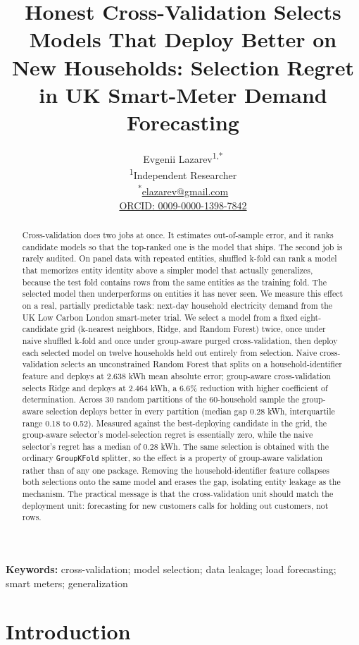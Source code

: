 \documentclass[10pt]{article}
\title{Honest Cross-Validation Selects Models That Deploy Better on New
Households: Selection Regret in UK Smart-Meter Demand Forecasting}
\author{
Evgenii Lazarev\textsuperscript{1,*}\\
\textsuperscript{1}Independent Researcher\\
\textsuperscript{*}\href{mailto:elazarev@gmail.com}{elazarev@gmail.com}\\
\href{https://orcid.org/0009-0000-1398-7842}{ORCID: 0009-0000-1398-7842}
}
\date{}
\begin{document}
\maketitle

\begin{abstract}
Cross-validation does two jobs at once. It estimates out-of-sample error, and it
ranks candidate models so that the top-ranked one is the model that ships. The
second job is rarely audited. On panel data with repeated entities, shuffled
k-fold can rank a model that memorizes entity identity above a simpler model
that actually generalizes, because the test fold contains rows from the same
entities as the training fold. The selected model then underperforms on entities
it has never seen. We measure this effect on a real, partially predictable task:
next-day household electricity demand from the UK Low Carbon London smart-meter
trial. We select a model from a fixed eight-candidate grid (k-nearest neighbors,
Ridge, and Random Forest) twice, once under naive shuffled k-fold and once under
group-aware purged cross-validation, then deploy each selected model on twelve
households held out entirely from selection. Naive cross-validation selects an
unconstrained Random Forest that splits on a household-identifier feature and
deploys at 2.638 kWh mean absolute error; group-aware cross-validation selects
Ridge and deploys at 2.464 kWh, a 6.6\% reduction with higher coefficient of
determination. Across 30 random partitions of the 60-household sample the
group-aware selection deploys better in every partition (median gap 0.28 kWh,
interquartile range 0.18 to 0.52). Measured against the best-deploying candidate
in the grid, the group-aware selector's model-selection regret is essentially
zero, while the naive selector's regret has a median of 0.28 kWh. The same
selection is obtained with the ordinary \texttt{GroupKFold} splitter, so the
effect is a property of group-aware validation rather than of any one package.
Removing the household-identifier feature collapses both selections onto the same
model and erases the gap, isolating entity leakage as the mechanism. The
practical message is that the cross-validation unit should match the deployment
unit: forecasting for new customers calls for holding out customers, not rows.
\end{abstract}

\noindent\textbf{Keywords:} cross-validation; model selection; data leakage;
load forecasting; smart meters; generalization

\section{Introduction}
\end{document}
